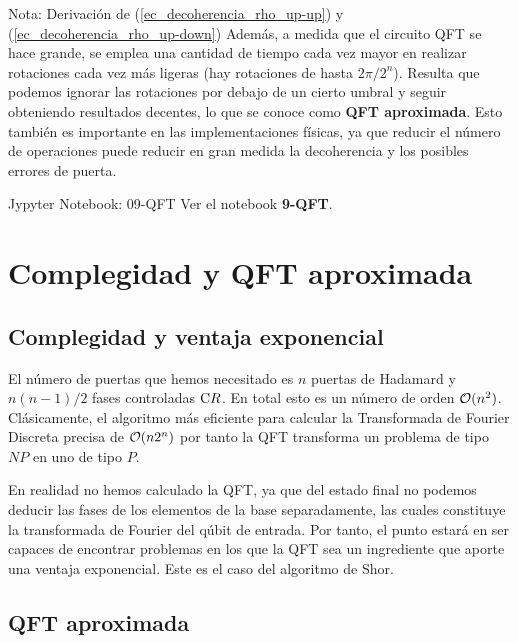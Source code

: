\documentclass[a4paper,11pt]{book} %
\numberwithin{equation}{chapter}
\newcommand{\cg}[1]{{\rm C}#1}
\begin{document}
\begin{mybox_blue}{Nota: Derivación de (\ref{ec_decoherencia_rho_up-up}) y  (\ref{ec_decoherencia_rho_up-down})}
Además, a medida que el circuito QFT se hace grande, se emplea una cantidad de tiempo cada vez mayor en realizar rotaciones cada vez más ligeras (hay rotaciones de hasta $2\pi/2^n$). Resulta que podemos ignorar las rotaciones por debajo de un cierto umbral y seguir obteniendo resultados decentes, lo que se conoce como \textbf{QFT aproximada}. Esto también es importante en las implementaciones físicas, ya que reducir el número de operaciones puede reducir en gran medida la decoherencia y los posibles errores de puerta.
 
	\begin{mybox_orange}{Jypyter Notebook: 09-QFT}
	Ver el notebook \textbf{9-QFT}.
	\end{mybox_orange}

	
	
\section{Complegidad y QFT aproximada}

	\subsection{Complegidad y ventaja exponencial}
	
El número de puertas que hemos necesitado es $n$ puertas de Hadamard y $n(n-1)/2$ fases controladas $\cg{R}$. En total esto es un número de orden ${\cal O}(n^2)$.  Clásicamente, el algoritmo más eficiente para calcular la Transformada de Fourier Discreta precisa de ${\cal O}(n 2^n)$ por tanto la QFT transforma un problema de tipo  $NP$ en uno de tipo $P$. 

En realidad no hemos calculado la QFT, ya que del estado final no podemos deducir las fases  de los elementos de la base separadamente, las cuales constituye la transformada de Fourier del qúbit de entrada. Por tanto, el punto estará en ser capaces de encontrar problemas en los que la QFT sea un ingrediente que aporte una ventaja exponencial. Este es el caso del algoritmo de Shor.

	\subsection{QFT aproximada}
	

\end{mybox_blue}
\end{document}
